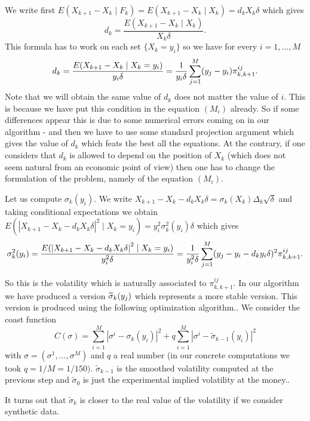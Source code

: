 \documentclass[a4paper]{article}
\begin{document}
We write first $E(X_{k+1}-X_{k}\mid F_{k})=E(X_{k+1}-X_{k}\mid
X_{k})=d_{k}X_{k}\delta $ which gives
\[
d_{k}=\frac{E(X_{k+1}-X_{k}\mid X_{k})}{X_{k}\delta }.
\]
This formula has to work on each set $\{X_{k}=y_{i}\}$ so we have for every $%
i=1,...,M$%
\[
d_{k}=\frac{E(X_{k+1}-X_{k}\mid X_{k}=y_{i})}{y_{i}\delta }=\frac{1}{%
y_{i}\delta }\sum_{j=1}^{M}(y_{j}-y_{i})\pi _{k,k+1}^{ij}.
\]
Note that we will obtain the same value of $d_{k}$ does not matter
the value of $i.$ This is because we have put this condition in
the equation $(M_{i})$ already. So if some differences appear this
is due to some numerical errors coming on in our algorithm - and
then we have to use some standard projection argument which gives
the value of $d_{k}$ which feats the best all the equations. At
the contrary, if one considers that $d_{k}$ is allowed to depend
on the position of $X_{k}$ (which does not seem natural from an
economic point of view) then one has to change the formulation of
the problem, namely of the equation $(M_{i}).$

Let us compute $\sigma _{k}(y_{i}).$ We write $X_{k+1}-X_{k}-d_{k}X_{k}%
\delta =\sigma _{k}(X_{k})\Delta _{k}\sqrt{\delta }$ and taking conditional
expectations we obtain $E(\left| X_{k+1}-X_{k}-d_{k}X_{k}\delta \right|
^{2}\mid X_{k}=y_{i})=y_{i}^{2}\sigma _{k}^{2}(y_{i})\delta $ which gives
\begin{equation*}
\sigma _{k}^{2}(y_{i})=\frac{E(\left| X_{k+1}-X_{k}-d_{k}X_{k}\delta \right|
^{2}\mid X_{k}=y_{i})}{y_{i}^{2}\delta }\\=\frac{1}{y_{i}^{2}\delta }
\sum_{j=1}^{M}(y_{j}-y_{i}-d_{k}y_{i}\delta )^{2}\pi _{k,k+1}^{ij}.
\end{equation*}

So this is the volatility which is naturally associated to $\pi
_{k,k+1}^{ij}.$ In our algorithm we have produced a version $\widetilde{%
\sigma }_{k}(y_{j})$ which represents a more stable version. This version is
produced using the following optimization algorithm.. We consider the coast
function
\[
C(\sigma )=\sum_{i=1}^{M}\left| \sigma ^{i}-\sigma _{k}(y_{i})\right|
^{2}+q\sum_{i=1}^{M}\left| \sigma ^{i}-\widetilde{\sigma }
_{k-1}(y_{i})\right| ^{2}
\]
with $\sigma =(\sigma ^{1},...,\sigma ^{M})$ and $q$ a real number (in our
concrete computations we took $q=1/M=1/150).$ $\widetilde{\sigma }_{k-1}$ is
the smoothed volatility computed at the previous step and $\widetilde{\sigma
}_{0}$ is just the experimental implied volatility at the money..

It turns out that $\widetilde{\sigma }_{k}$ is closer to the real value of
the volatility if we consider synthetic data.
\end{document}

